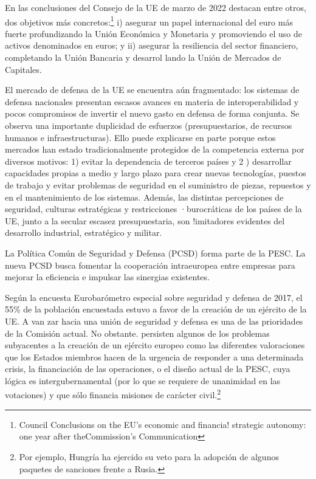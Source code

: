 \documentclass[10pt,a4paper]{article}
\begin{document}
En las conclusiones del Consejo de la UE de marzo de 2022 destacan entre otros, dos objetivos más concretos:\footnote{%
    Council Conclusions on the EU's economic and financia! strategic autonomy: one year after theCommission's Communication
} i) asegurar un papel internacional del euro más fuerte profundizando la Unión Económica y Monetaria y promoviendo el uso de activos denominados en euros; y ii) asegurar la resiliencia del sector financiero, completando la Unión Bancaria y desarrol lando la Unión de Mercados de Capitales.

El mercado de defensa de la UE se encuentra aún fragmentado: los sistemas de defensa nacionales presentan escasos avances en materia de interoperabilidad y pocos compromisos de invertir el nuevo gasto en defensa de forma conjunta. Se observa una importante duplicidad de esfuerzos (presupuestarios, de recursos humanos e infraestructuras). Ello puede explicarse en parte porque estos mercados han estado tradicionalmente protegidos de la competencia externa por diversos motivos: 1) evitar la dependencia de terceros países y 2 ) desarrollar capacidades propias a medio y largo plazo para crear nuevas tecnologías, puestos de trabajo y evitar problemas de seguridad en el suministro de piezas, repuestos y en el mantenimiento de los sistemas. Además, las distintas percepciones de seguridad, culturas estratégicas y restricciones ·burocráticas de los países de la UE, junto a la secular escasez presupuestaria, son !imitadores evidentes del desarrollo industrial, estratégico y militar.

La Política Común de Seguridad y Defensa (PCSD) forma parte de la PESC. La nueva PCSD busca fomentar la cooperación intraeuropea entre empresas para mejorar la eficiencia e impulsar las sinergias existentes.

Según la encuesta Eurobarómetro especial sobre seguridad y defensa de 2017, el 55\% de la población encuestada estuvo a favor de la creación de un ejército de la UE. A van zar hacia una unión de seguridad y defensa es una de las prioridades de la Comisión actual. No obstante. persisten algunos de los problemas subyacentes a la creación de un ejército europeo como las diferentes valoraciones que los Estados miembros hacen de la urgencia de responder a una determinada crisis, la financiación de las operaciones, o el diseño actual de la PESC, cuya lógica es intergubernamental (por lo que se requiere de unanimidad en las votaciones) y que sólo financia misiones de carácter civil.\footnote{%
    Por ejemplo, Hungría ha ejercido su veto para la adopción de algunos paquetes de sanciones frente a Rusia.
} 
\end{document}
